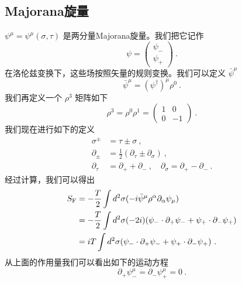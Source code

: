 \subsection{Majorana旋量}
$\psi^\mu = \psi^\mu(\sigma,\tau)$ 是两分量Majorana旋量。我们把它记作
\begin{equation}
\psi = \begin{pmatrix}
\psi_- \\
\psi_+
\end{pmatrix}~.
\end{equation}
在洛伦兹变换下，这些场按照矢量的规则变换。我们可以定义 $\bar\psi^\mu$
\begin{equation}
\bar\psi^\mu = (\psi^\dagger)^\mu \rho^0~.
\end{equation}
我们再定义一个 $\rho^3$ 矩阵如下
\begin{equation}
\rho^3 = \rho^0 \rho^1 = \begin{pmatrix}
1 & 0 \\
0 & -1 
\end{pmatrix}~.
\end{equation}
我们现在进行如下的定义
\begin{equation}
\begin{aligned}
\sigma^{\pm} & = \tau \pm \sigma~, \\
\partial_{\pm} & = \frac{1}{2} (\partial_\tau \pm \partial_\sigma)~, \\
\partial_\tau & = \partial_+ + \partial_-~, \quad \partial_\sigma = \partial_+ - \partial_- ~.
\end{aligned}
\end{equation}
经过计算，我们可以得出
\begin{equation}
\begin{aligned}
S_{\rm F} & = - \frac{T}{2} \int d^2 \sigma (- i \bar \psi^\mu \rho^\alpha \partial_\alpha \psi_\mu ) \\
& = - \frac{T}{2} \int d^2\sigma (-2i) (\psi_-\cdot\partial_+\psi_- + \psi_+\cdot \partial_- \psi_+) \\
& = i T\int d^2\sigma (\psi_-\cdot \partial_+ \psi_- +\psi_+\cdot \partial_- \psi_+ )~.
\end{aligned}
\end{equation}
从上面的作用量我们可以看出如下的运动方程
\begin{equation}
\partial_+\psi^\mu_- = \partial_-\psi^\mu_+ = 0~.
\end{equation}

